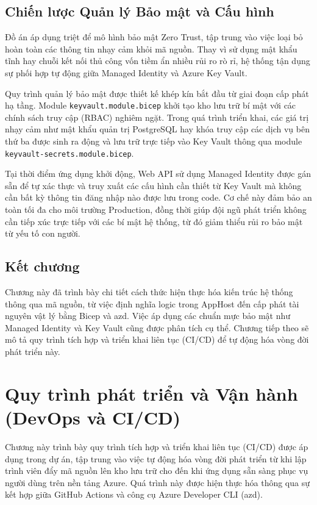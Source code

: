 \documentclass[a4paper,12pt,twoside]{report}
\begin{document}
\section{Chiến lược Quản lý Bảo mật và Cấu hình}

Đồ án áp dụng triệt để mô hình bảo mật Zero Trust, tập trung vào việc loại bỏ hoàn toàn các thông tin nhạy cảm khỏi mã nguồn. Thay vì sử dụng mật khẩu tĩnh hay chuỗi kết nối thủ công vốn tiềm ẩn nhiều rủi ro rò rỉ, hệ thống tận dụng sự phối hợp tự động giữa Managed Identity và Azure Key Vault.

Quy trình quản lý bảo mật được thiết kế khép kín bắt đầu từ giai đoạn cấp phát hạ tầng. Module \texttt{keyvault.module.bicep} khởi tạo kho lưu trữ bí mật với các chính sách truy cập (RBAC) nghiêm ngặt. Trong quá trình triển khai, các giá trị nhạy cảm như mật khẩu quản trị PostgreSQL hay khóa truy cập các dịch vụ bên thứ ba được sinh ra động và lưu trữ trực tiếp vào Key Vault thông qua module \texttt{keyvault-secrets.module.bicep}. 

Tại thời điểm ứng dụng khởi động, Web API sử dụng Managed Identity được gán sẵn để tự xác thực và truy xuất các cấu hình cần thiết từ Key Vault mà không cần bất kỳ thông tin đăng nhập nào được lưu trong code. Cơ chế này đảm bảo an toàn tối đa cho môi trường Production, đồng thời giúp đội ngũ phát triển không cần tiếp xúc trực tiếp với các bí mật hệ thống, từ đó giảm thiểu rủi ro bảo mật từ yếu tố con người.


\section*{Kết chương}

Chương này đã trình bày chi tiết cách thức hiện thực hóa kiến trúc hệ thống thông qua mã nguồn, từ việc định nghĩa logic trong AppHost đến cấp phát tài nguyên vật lý bằng Bicep và azd. Việc áp dụng các chuẩn mực bảo mật như Managed Identity và Key Vault cũng được phân tích cụ thể. Chương tiếp theo sẽ mô tả quy trình tích hợp và triển khai liên tục (CI/CD) để tự động hóa vòng đời phát triển này.


\chapter{Quy trình phát triển và Vận hành (DevOps và CI/CD)}
\label{chap:devops-cicd}

Chương này trình bày quy trình tích hợp và triển khai liên tục (CI/CD) được áp dụng trong dự án, tập trung vào việc tự động hóa vòng đời phát triển từ khi lập trình viên đẩy mã nguồn lên kho lưu trữ cho đến khi ứng dụng sẵn sàng phục vụ người dùng trên nền tảng Azure. Quá trình này được hiện thực hóa thông qua sự kết hợp giữa GitHub Actions và công cụ Azure Developer CLI (azd).
\end{document}
